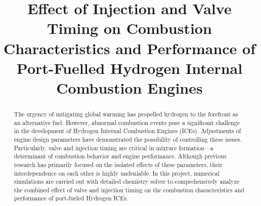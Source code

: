 \documentclass[conference]{IEEEtran}
\begin{document}
\title{Effect of Injection and Valve Timing on Combustion Characteristics and Performance of Port-Fuelled Hydrogen Internal Combustion Engines
}

\author{
\and
{}
\and
{}
\and
{}
\and
{}
}

\maketitle

\begin{abstract}
The urgency of mitigating global warming has propelled hydrogen to the forefront as an alternative fuel.
However, abnormal combustion events pose a significant challenge in the development of Hydrogen Internal Combustion Engines (ICEs).
Adjustments of engine design parameters have demonstrated the possibility of controlling these issues.
Particularly, valve and injection timing are critical in mixture formation—a determinant of combustion behavior and engine performance.
Although previous research has primarily focused on the isolated effects of these parameters, their interdependence on each other is highly undeniable.
In this project, numerical simulations are carried out with detailed chemistry solver to comprehensively analyze the combined effect of valve and injection timing on the combustion characteristics and performance of port-fueled Hydrogen ICEs.
\end{abstract}
\end{document}
